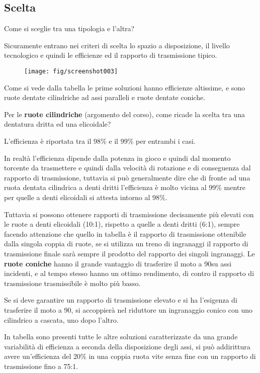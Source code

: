 \documentclass[a4paper, 15pt]{article}
\begin{document}
\subsection{Scelta}
\begin{adjustwidth}{2in}{}
	Come si sceglie tra una tipologia e l'altra? 
	
	Sicuramente entrano nei criteri di scelta lo spazio a disposizione, il livello tecnologico e quindi le efficienze ed il rapporto di trasmissione tipico.
	\begin{figure}[H]
		\centering
		\texttt{[image: fig/screenshot003]}
		\label{fig:screenshot003}
	\end{figure}
	Come si vede dalla tabella le prime soluzioni hanno efficienze altissime, e sono ruote dentate cilindriche ad assi paralleli e ruote dentate coniche.
	
	Per le \textbf{ruote cilindriche} (argomento del corso), come ricade la scelta tra una dentatura dritta ed una elicoidale? 
	
	L'efficienza è riportata tra il 98\% e il 99\% per entrambi i casi.
	
	In realtà l'efficienza dipende dalla potenza in gioco e quindi dal momento torcente da trasmettere e quindi dalla velocità di rotazione e di conseguenza dal rapporto di trasmissione, tuttavia si può generalmente dire che di fronte ad una ruota dentata cilindrica a denti dritti l'efficienza è molto vicina al 99\% mentre per quelle a denti elicoidali si attesta intorno al 98\%.
	
	Tuttavia si possono ottenere rapporti di trasmissione decisamente più elevati con le ruote a denti elicoidali (10:1), rispetto a quelle a denti dritti (6:1), sempre facendo attenzione che quello in tabella è il rapporto di trasmissione ottenibile dalla singola coppia di ruote, se si utilizza un treno di ingranaggi il rapporto di trasmissione finale sarà sempre il prodotto del rapporto dei singoli ingranaggi. 
\newpage	
	Le \textbf{ruote coniche} hanno il grande vantaggio di trasferire il moto a 90\degree su assi incidenti, e al tempo stesso hanno un ottimo rendimento, di contro il rapporto di trasmissione trasmissibile è molto più basso.
	
	Se si deve garantire un rapporto di trasmissione elevato e si ha l'esigenza di trasferire il moto a 90\degree, si accoppierà nel riduttore un ingranaggio conico con uno cilindrico a cascata, uno dopo l'altro. \newline 
	
	In tabella sono presenti tutte le altre soluzioni caratterizzate da una grande variabilità di efficienza a seconda della disposizione degli assi, si può addirittura avere un'efficienza del 20\% in una coppia ruota vite senza fine con un rapporto di trasmissione fino a 75:1. 
	

\end{adjustwidth}
\end{document}
